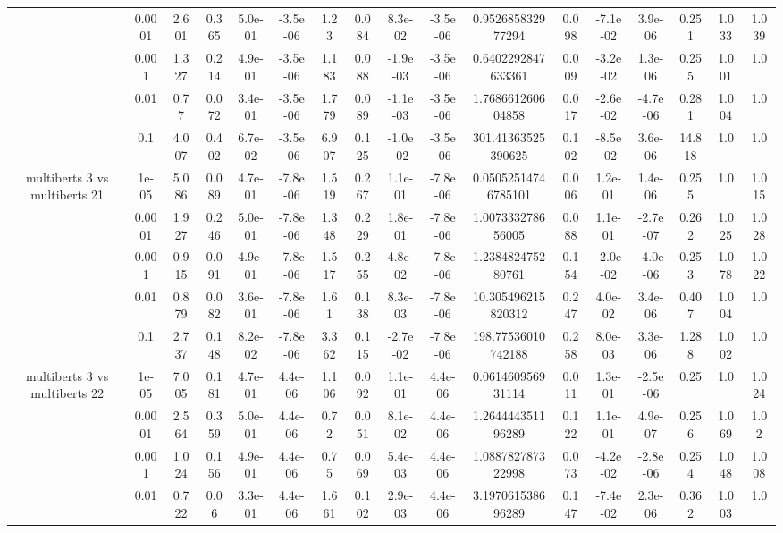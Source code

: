 \begin{tabular}{|c|c|c|c|c|c|c|c|c|c|c|c|c|c|c|c|c|}
 & 0.0001 & 2.601 & 0.365 & 5.0e-01 & -3.5e-06 & 1.23 & 0.084 & 8.3e-02 & -3.5e-06 & 0.952685832977294 & 0.098 & -7.1e-02 & 3.9e-06 & 0.251 & 1.033 & 1.039 \\
 & 0.001 & 1.327 & 0.214 & 4.9e-01 & -3.5e-06 & 1.183 & 0.088 & -1.9e-03 & -3.5e-06 & 0.6402292847633361 & 0.009 & -3.2e-02 & 1.3e-06 & 0.255 & 1.001 & 1.0 \\
 & 0.01 & 0.77 & 0.072 & 3.4e-01 & -3.5e-06 & 1.779 & 0.089 & -1.1e-03 & -3.5e-06 & 1.768661260604858 & 0.017 & -2.6e-02 & -4.7e-06 & 0.281 & 1.004 & 1.0 \\
 & 0.1 & 4.007 & 0.402 & 6.7e-02 & -3.5e-06 & 6.907 & 0.125 & -1.0e-02 & -3.5e-06 & 301.41363525390625 & 0.102 & -8.5e-02 & 3.6e-06 & 14.818 & 1.0 & 1.0 \\
\hline
\multirow{5}{*}{multiberts 3 vs multiberts 21} & 1e-05 & 5.086 & 0.089 & 4.7e-01 & -7.8e-06 & 1.519 & 0.267 & 1.1e-01 & -7.8e-06 & 0.05052514746785101 & 0.006 & 1.2e-01 & 1.4e-06 & 0.255 & 1.0 & 1.015 \\
 & 0.0001 & 1.927 & 0.246 & 5.0e-01 & -7.8e-06 & 1.348 & 0.229 & 1.8e-01 & -7.8e-06 & 1.007333278656005 & 0.088 & 1.1e-01 & -2.7e-07 & 0.262 & 1.025 & 1.028 \\
 & 0.001 & 0.915 & 0.091 & 4.9e-01 & -7.8e-06 & 1.517 & 0.255 & 4.8e-02 & -7.8e-06 & 1.238482475280761 & 0.154 & -2.0e-02 & -4.0e-06 & 0.253 & 1.078 & 1.022 \\
 & 0.01 & 0.879 & 0.082 & 3.6e-01 & -7.8e-06 & 1.61 & 0.138 & 8.3e-03 & -7.8e-06 & 10.305496215820312 & 0.247 & 4.0e-02 & 3.4e-06 & 0.407 & 1.004 & 1.0 \\
 & 0.1 & 2.737 & 0.148 & 8.2e-02 & -7.8e-06 & 3.362 & 0.115 & -2.7e-02 & -7.8e-06 & 198.77536010742188 & 0.258 & 8.0e-03 & 3.3e-06 & 1.288 & 1.002 & 1.0 \\
\hline
\multirow{5}{*}{multiberts 3 vs multiberts 22} & 1e-05 & 7.005 & 0.181 & 4.7e-01 & 4.4e-06 & 1.106 & 0.092 & 1.1e-01 & 4.4e-06 & 0.061460956931114 & 0.011 & 1.3e-01 & -2.5e-06 & 0.25 & 1.0 & 1.024 \\
 & 0.0001 & 2.564 & 0.359 & 5.0e-01 & 4.4e-06 & 0.72 & 0.051 & 8.1e-02 & 4.4e-06 & 1.264444351196289 & 0.122 & 1.1e-01 & 4.9e-07 & 0.256 & 1.069 & 1.02 \\
 & 0.001 & 1.024 & 0.156 & 4.9e-01 & 4.4e-06 & 0.75 & 0.069 & 5.4e-03 & 4.4e-06 & 1.088782787322998 & 0.073 & -4.2e-02 & -2.8e-06 & 0.254 & 1.048 & 1.008 \\
 & 0.01 & 0.722 & 0.06 & 3.3e-01 & 4.4e-06 & 1.661 & 0.102 & 2.9e-03 & 4.4e-06 & 3.197061538696289 & 0.147 & -7.4e-02 & 2.3e-06 & 0.362 & 1.003 & 1.0 \\

\end{tabular}
